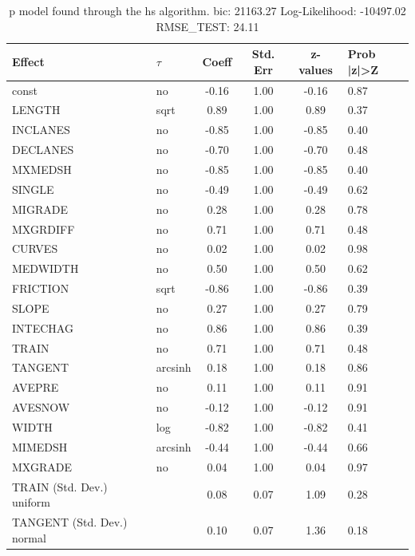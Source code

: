 \begin{table}
	\caption{p model found through the hs algorithm. bic: 21163.27 Log-Likelihood: -10497.02 RMSE_TEST: 24.11}
	\begin{center}
		\begin{tabular}{|l|l|c|c|c|l|}
			\hline
			Effect & $\tau$ & Coeff & Std. Err & z-values & Prob |z|>Z \\
			\hline
			const & no & -0.16 & 1.00 & -0.16 & 0.87 \\
			\hline
			LENGTH & sqrt & 0.89 & 1.00 & 0.89 & 0.37 \\
			\hline
			INCLANES & no & -0.85 & 1.00 & -0.85 & 0.40 \\
			\hline
			DECLANES & no & -0.70 & 1.00 & -0.70 & 0.48 \\
			\hline
			MXMEDSH & no & -0.85 & 1.00 & -0.85 & 0.40 \\
			\hline
			SINGLE & no & -0.49 & 1.00 & -0.49 & 0.62 \\
			\hline
			MIGRADE & no & 0.28 & 1.00 & 0.28 & 0.78 \\
			\hline
			MXGRDIFF & no & 0.71 & 1.00 & 0.71 & 0.48 \\
			\hline
			CURVES & no & 0.02 & 1.00 & 0.02 & 0.98 \\
			\hline
			MEDWIDTH & no & 0.50 & 1.00 & 0.50 & 0.62 \\
			\hline
			FRICTION & sqrt & -0.86 & 1.00 & -0.86 & 0.39 \\
			\hline
			SLOPE & no & 0.27 & 1.00 & 0.27 & 0.79 \\
			\hline
			INTECHAG & no & 0.86 & 1.00 & 0.86 & 0.39 \\
			\hline
			TRAIN & no & 0.71 & 1.00 & 0.71 & 0.48 \\
			\hline
			TANGENT & arcsinh & 0.18 & 1.00 & 0.18 & 0.86 \\
			\hline
			AVEPRE & no & 0.11 & 1.00 & 0.11 & 0.91 \\
			\hline
			AVESNOW & no & -0.12 & 1.00 & -0.12 & 0.91 \\
			\hline
			WIDTH & log & -0.82 & 1.00 & -0.82 & 0.41 \\
			\hline
			MIMEDSH & arcsinh & -0.44 & 1.00 & -0.44 & 0.66 \\
			\hline
			MXGRADE & no & 0.04 & 1.00 & 0.04 & 0.97 \\
			\hline
			TRAIN (Std. Dev.) uniform &  & 0.08 & 0.07 & 1.09 & 0.28 \\
			\hline
			TANGENT (Std. Dev.) normal &  & 0.10 & 0.07 & 1.36 & 0.18 \\

\end{tabular}
\end{center}
\end{table}
